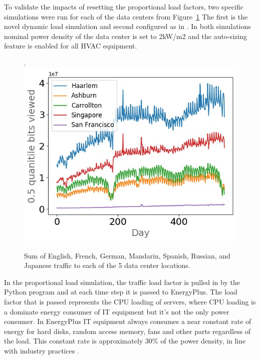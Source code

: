 To validate the impacts of resetting the proportional load factors, two specific simulations were run for each of the data centers from Figure~\ref{fig:lang2dc} The first is the novel dynamic load simulation and second configured as in \citep{moriyama18}. In both simulations nominal power density of the data center is set to 2kW/m2 and the auto-sizing feature is enabled for all HVAC equipment. 

\begin{figure}.
\centering
\includegraphics[scale=0.45]{img/lang2dc_curve.jpg}
\caption{Sum of English, French, German, Mandarin, Spanish, Russian, and Japanese traffic to each of the 5 data center locations.}
\label{fig:lang2dc}
\end{figure}

In the proportional load simulation, the traffic load factor is pulled in by the Python program and at each time step it is passed to EnergyPlus. The load factor that is passed represents the CPU loading of servers, where CPU loading is a dominate energy consumer of IT equipment but it’s not the only power consumer. In EnergyPlus IT equipment always consumes a near constant rate of energy for hard disks, random access memory, fans and other parts regardless of the load. This constant rate is approximately 30\% of the power density, in line with industry practices \citep{barroso18}. 

